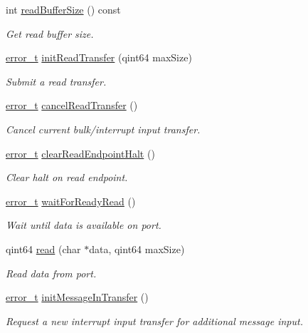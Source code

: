 \begin{DoxyCompactItemize}
int \hyperlink{classmdt_usb_port_af546a031ed8621fee1d5e9498cbcd174}{readBufferSize} () const 
\begin{DoxyCompactList}\small\item\em Get read buffer size. \end{DoxyCompactList}\item 
\hyperlink{classmdt_abstract_port_ad4121bb930c95887e77f8bafa065a85e}{error\_\-t} \hyperlink{classmdt_usb_port_a5e380852b8726f71e8558c86cba5bd1f}{initReadTransfer} (qint64 maxSize)
\begin{DoxyCompactList}\small\item\em Submit a read transfer. \end{DoxyCompactList}\item 
\hyperlink{classmdt_abstract_port_ad4121bb930c95887e77f8bafa065a85e}{error\_\-t} \hyperlink{classmdt_usb_port_a3570b708f9f51408e4bbf2f61cc8c881}{cancelReadTransfer} ()
\begin{DoxyCompactList}\small\item\em Cancel current bulk/interrupt input transfer. \end{DoxyCompactList}\item 
\hyperlink{classmdt_abstract_port_ad4121bb930c95887e77f8bafa065a85e}{error\_\-t} \hyperlink{classmdt_usb_port_af940b6fe25e874ff0746686bc30c4f2c}{clearReadEndpointHalt} ()
\begin{DoxyCompactList}\small\item\em Clear halt on read endpoint. \end{DoxyCompactList}\item 
\hyperlink{classmdt_abstract_port_ad4121bb930c95887e77f8bafa065a85e}{error\_\-t} \hyperlink{classmdt_usb_port_ab8ddd4ebee603ac381e8da0383a61e36}{waitForReadyRead} ()
\begin{DoxyCompactList}\small\item\em Wait until data is available on port. \end{DoxyCompactList}\item 
qint64 \hyperlink{classmdt_usb_port_abce257345c8af47494215cd7ee75f82d}{read} (char $\ast$data, qint64 maxSize)
\begin{DoxyCompactList}\small\item\em Read data from port. \end{DoxyCompactList}\item 
\hyperlink{classmdt_abstract_port_ad4121bb930c95887e77f8bafa065a85e}{error\_\-t} \hyperlink{classmdt_usb_port_a897234cc2c7561da323cb124f57bcc28}{initMessageInTransfer} ()
\begin{DoxyCompactList}\small\item\em Request a new interrupt input transfer for additional message input. \end{DoxyCompactList}\item 

\end{DoxyCompactItemize}
